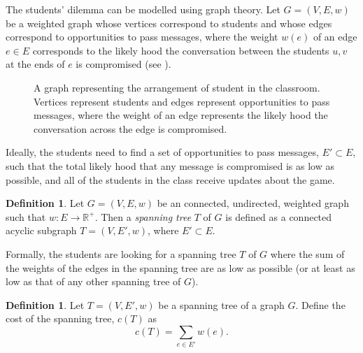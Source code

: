 \documentclass[a4paper,11pt]{report}
\theoremstyle{plain}
\theoremstyle{definition}
\newtheorem{defn}[thm]{Definition}
\begin{document}
The students' dilemma can be modelled using graph theory. Let $G = (V, E, w)$ be
a weighted graph whose vertices correspond to students and whose edges
correspond to opportunities to pass messages, where the weight $w(e)$ of an edge
$e \in E$ corresponds to the likely hood the conversation between the students
$u,v$ at the ends of $e$ is compromised (see ).

\begin{figure}[h]
\centering
\caption{A graph representing the arrangement of student in the classroom.
Vertices represent students and edges represent opportunities to pass messages,
where the weight of an edge represents the likely hood the conversation
across the edge is compromised.}
\label{fig:class-graph}
\end{figure}

Ideally, the students need to find a set of opportunities to pass messages,
$E' \subset E$, such that the total likely hood that any message is compromised
is as low as possible, and all of the students in the class receive updates
about the game.

\begin{defn}
Let $G = (V, E, w)$ be an connected, undirected, weighted graph such that
$w : E \to \mathbb{R}^+$. Then a \emph{spanning tree} $T$ of $G$ is defined as
a connected acyclic subgraph $T = (V, E', w)$, where $E' \subset E$.
\end{defn}

Formally, the students are looking for a spanning tree $T$ of $G$ where the
sum of the weights of the edges in the spanning tree are as low as possible
(or at least as low as that of any other spanning tree of $G$).

\begin{defn}
Let $T = (V, E', w)$ be a spanning tree of a graph $G$. Define the cost of the
spanning tree, $c(T)$ as
\begin{equation*}
    c(T) = \sum_{e \in E'}{w(e)}.
\end{equation*}
\end{defn}
\end{document}
